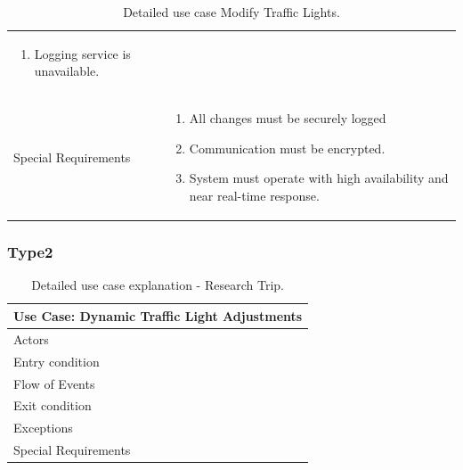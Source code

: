 \documentclass[11.5pt]{article}
\begin{document}
\begin{table}[!htp]
\begin{tabular}{@{} l p{23em} @{}}
\begin{enumerate}[left=0pt, parsep=0pt, topsep=0pt]
            \item Logging service is unavailable.
            \end{enumerate} \\
            Special Requirements                                                             & \begin{enumerate}[left=0pt, parsep=0pt, topsep=0pt]
            \item All changes must be securely logged
            \item Communication must be encrypted.
            \item System must operate with high availability and near real-time response.
            \end{enumerate} \\
            \bottomrule
        \end{tabular}
        \caption{Detailed use case Modify Traffic Lights.}
        \label{Use Case - Research Trip}
    \end{table}
    \subsubsection{Type2}
    \begin{table}[!htp]
        \centering
        \begin{tabular}{@{} l p{23em} @{}}
            \toprule \multicolumn{2}{c}{Use Case: \textbf{Dynamic Traffic Light Adjustments}} \\
            \midrule                                                                          %
            Actors                                                                           &  \\
            Entry condition                                                                  &  \\
            Flow of Events                                                                   &  \\
            Exit condition                                                                   &  \\
            Exceptions                                                                       &  \\
            Special Requirements                                                             &  \\
            \bottomrule
        \end{tabular}
        \caption{Detailed use case explanation - Research Trip.}
        \label{Use Case - Research Trip}
    \end{table}
\end{document}

